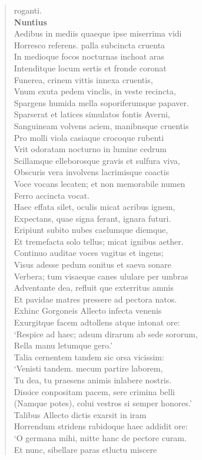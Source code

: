 \documentclass[11pt, a4paper]{report}
\begin{document}
\begin{verse}
{roganti. \\ \textbf{Nuntius} \\Aedibus in mediis quaeque ipse miserrima vidi \\ Horresco referens. palla subcincta cruenta \\ In medioque focos nocturnas inchoat aras \\ Intenditque locum sertis et fronde coronat \\ Funerea, crinem vittis innexa cruentis, \\ Vnum exuta pedem vinclis, in veste recincta, \\ Spargens humida mella soporiferumque papaver. \\ Sparserat et latices simulatos fontis Averni, \\ Sanguineam volvens aciem, manibnsque cruentis \\ Pro molli viola casiaque crocoque rubenti \\ Vrit odoratam nocturno in lumine cedrum \\ Scillamque elleborosque gravis et sulfura viva, \\ Obscuris vera involvens lacrimisque coactis \\ Voce vocans lecaten; et non memorabile numen \\ Ferro accincta vocat. \\ Haec effata silet, oculis micat acribus ignem, \\ Expectans, quae signa ferant, ignara futuri. \\ Eripiunt subito nubes caelumque diemque, \\ Et tremefacta solo tellus; micat ignibus aether. \\ Continuo auditae voces vagitus et ingens; \\ Visus adesse pedum sonitus et saeva sonare \\ Verbera;  \lbrack tum \rbrack  visaeque canes ululare per umbras \\ Adventante dea, refluit \lbrack que \rbrack  exterritus amnis \\ Et pavidae matres pressere ad pectora natos. \\ Exhinc Gorgoneis Allecto infecta venenis \\ Exurgitque facem adtollens atque intonat ore: \\ ‘Respice ad haec; adsum dirarum ab sede sororum, \\ Rella manu letumque gero.’ \\ Talia cernentem tandem sic orsa vicissim: \\ ‘Venisti tandem. mecum partire laborem, \\ Tu dea, tu praesens animis inlabere nostris. \\ Dissice conpositam pacem, sere crimina belli \\ (Namque potes), colui vestros si semper honores.’ \\ Talibus Allecto dictis exarsit in iram \\ Horrendum stridens rabidoque haec addidit ore: \\ ‘O germana mihi, mitte hanc de pectore curam. \\  \lbrack Et \rbrack  nunc, sibellare paras etluctu miscere }
\end{verse}
\end{document}
